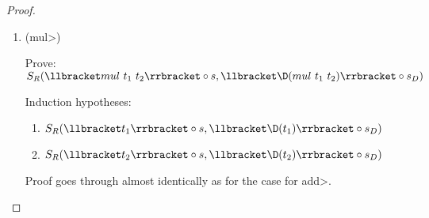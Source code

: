 \begin{proof}
\begin{enumerate}
      \item (\<mul>)

      Prove: $S_R(\llbracket mul\ t_1\ t_2 \rrbracket \circ s, \llbracket \D(mul\ t_1\ t_2) \rrbracket \circ s_D)$

      Induction hypotheses:
      \begin{enumerate}
        \item \label{eqn:subst_ih_mul1}$S_R(\llbracket t_1 \rrbracket \circ s, \llbracket \D(t_1) \rrbracket \circ s_D)$
        \item \label{eqn:subst_ih_mul2}$S_R(\llbracket t_2 \rrbracket \circ s, \llbracket \D(t_2) \rrbracket \circ s_D)$
      \end{enumerate}

      Proof goes through almost identically as for the case for \<add>.


\end{enumerate}
\end{proof}
